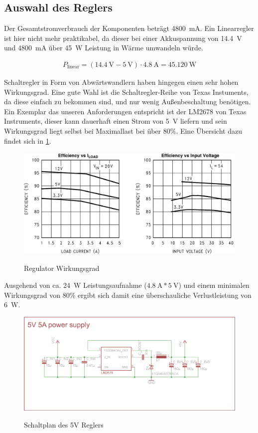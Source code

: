\subsection{Auswahl des Reglers}
Der Gesamtstromverbrauch der Komponenten beträgt \SI{4800}{\milli\ampere}. Ein Linearregler ist hier nicht mehr praktikabel, da dieser bei einer Akkuspannung von \SI{14,4}{\volt} und \SI{4800}{\milli\ampere} über \SI{45}{\watt} Leistung in Wärme umwandeln würde.

\begin{align*}
P_{\text{linear}}=(\SI{14,4}{\volt}-\SI{5}{\volt})\cdot \SI{4,8}{\ampere}=\SI{45,120}{\watt}
\end{align*}

Schaltregler in Form von Abwärtswandlern haben hingegen einen sehr hohen Wirkungsgrad. Eine gute Wahl ist die Schaltregler-Reihe von Texas Instuments, da diese einfach zu bekommen sind,
und nur wenig Außenbeschaltung benötigen. Ein Exemplar das unseren Anforderungen entspricht ist der LM2678 von Texas Instruments, dieser kann dauerhaft einen Strom von \SI{5}{\volt} liefern und sein Wirkungsgrad
liegt selbst bei Maximallast bei über 80\%.
Eine Übersicht dazu findet sich in \cref{fig:vreg-eff}.
\begin{figure}[H]
\centering
\includegraphics[width=.8\textwidth]{vreg.png}\\
\caption{Regulator Wirkungsgrad \cite{ds-ti}}%
\label{fig:vreg-eff}
\end{figure}
Ausgehend von ca. \SI{24}{\watt} Leistungsaufnahme ($\SI{4,8}{\ampere}*\SI{5}{\volt}$) und einem minimalen Wirkungsgrad von 80\%  ergibt sich damit eine überschauliche Verlustleistung von \SI{6}{\watt}.


\begin{figure}[H]
\centering
\includegraphics[width=\textwidth]{5vregler.png}\\
\caption{Schaltplan des 5V Reglers}%
\label{fig:vreg}
\end{figure}


